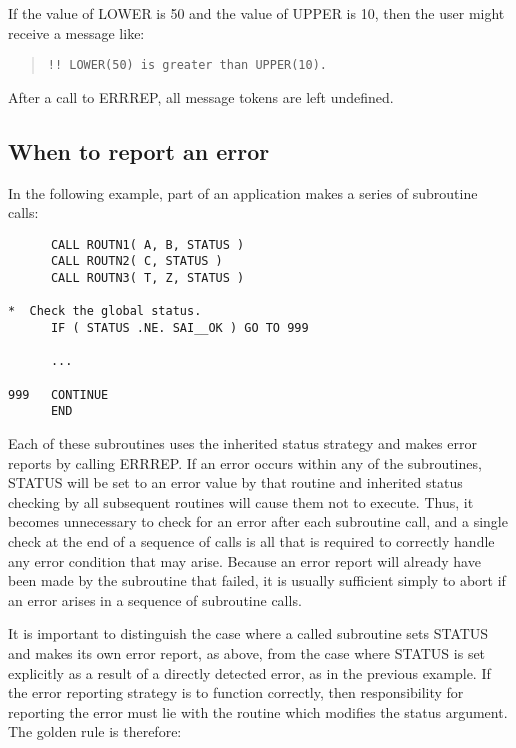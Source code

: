 \documentclass[twoside,11pt]{article}
\newcommand{\xlabel}[1]{}
\renewcommand{\_}{\texttt{\symbol{95}}}
\begin{document}
If the value of LOWER is 50 and the value of UPPER is 10, then the user
might receive a message like:

\begin {quote}
\begin {small}
\begin{verbatim}
!! LOWER(50) is greater than UPPER(10).
\end{verbatim}
\end {small}
\end {quote}

After a call to ERR\_REP, all message tokens are left undefined.


\subsection{\xlabel{when_to_report_an_error}When to report an error \label{when_sect}}

In the following example, part of an application makes a series of subroutine
calls:

\begin {small}
\begin{verbatim}
      CALL ROUTN1( A, B, STATUS )
      CALL ROUTN2( C, STATUS )
      CALL ROUTN3( T, Z, STATUS )

*  Check the global status.
      IF ( STATUS .NE. SAI__OK ) GO TO 999

      ...

999   CONTINUE
      END
\end{verbatim}
\end {small}

Each of these subroutines uses the inherited status strategy and makes
error reports by calling ERR\_REP.
If an error occurs within any of the subroutines, STATUS will be set
to an error value by that routine and inherited status checking by all
subsequent routines will cause them not to execute.
Thus, it becomes unnecessary to check for an error after each subroutine
call, and a single check at the end of a sequence of calls is all that is
required to correctly handle any error condition that may arise.
Because an error report will already have been made by the subroutine that
failed, it is usually sufficient simply to abort if an error arises in a
sequence of subroutine calls.

It is important to distinguish the case where a called subroutine sets STATUS
and makes its own error report, as above, from the case where STATUS is set
explicitly as a result of a directly detected error, as in the previous
example.
If the error reporting strategy is to function correctly, then responsibility
for reporting the error must lie with the routine which modifies the status
argument.
The golden rule is therefore:
\end{document}

